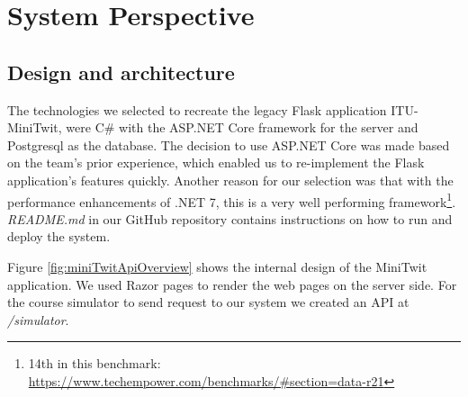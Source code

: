 \newpage
\section{System Perspective}




\subsection{Design and architecture}

The technologies we selected to recreate the legacy Flask application ITU-MiniTwit, were C\# with the ASP.NET Core framework for the server and Postgresql as the database. The decision to use ASP.NET Core was made based on the team's prior experience, which enabled us to re-implement the Flask application's features quickly. Another reason for our selection was that with the performance enhancements of .NET 7, this is a very well performing framework\footnote{14th in this benchmark: 
\url{https://www.techempower.com/benchmarks/\#section=data-r21}}. \textit{README.md} in our GitHub repository contains instructions on how to run and deploy the system.

Figure \ref{fig:miniTwitApiOverview} shows the internal design of the MiniTwit application. We used Razor pages to render the web pages on the server side. For the course simulator to send request to our system we created an API at \textit{/simulator}.

